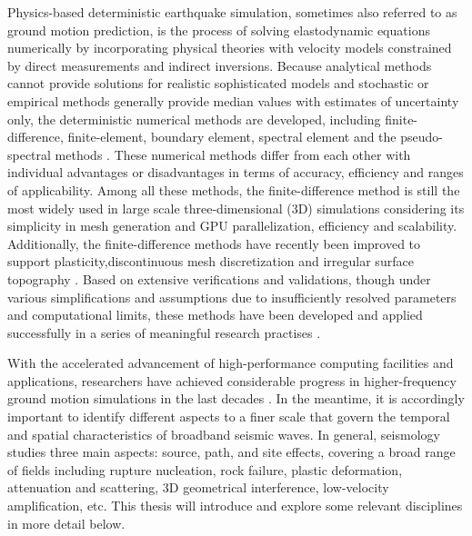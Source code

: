Physics-based deterministic earthquake simulation, sometimes also referred to as ground motion prediction, is the process of solving elastodynamic equations numerically by incorporating physical theories with velocity models constrained by direct measurements and indirect inversions. Because analytical methods cannot provide solutions for realistic sophisticated models and stochastic or empirical methods generally provide median values with estimates of uncertainty only, the deterministic numerical methods are developed, including finite-difference, finite-element, boundary element, spectral element and the pseudo-spectral methods . These numerical methods differ from each other with individual advantages or disadvantages in terms of accuracy, efficiency and ranges of applicability. Among all these methods, the finite-difference method is still the most widely used in large scale three-dimensional (3D) simulations considering its simplicity in mesh generation and GPU parallelization, efficiency and scalability. Additionally, the finite-difference methods have recently been improved to support plasticity,discontinuous mesh discretization and irregular surface topography . Based on extensive verifications and validations, though under various simplifications and assumptions due to insufficiently resolved parameters and computational limits, these methods have been developed and applied successfully in a series of meaningful research practises \citep[e.g., ShakeOut, PetaShake, M9 Cascadia; for more details readers are referred to ][]{cuiPetascaleEarthquakeSimulations2009,cuiTeraShakeComputationalPlatform2009,olsen2009shakeout,marafiImpactsSimulatedM92019}.

With the accelerated advancement of high-performance computing facilities and applications, researchers have achieved considerable progress in higher-frequency ground motion simulations in the last decades \citep{gravesBroadbandSimulationsSouthern2008,olsen2009shakeout,bielakShakeOutEarthquakeScenario2010,roten3DSimulationsEarthquakes2012, savranGroundMotionSimulation2019,withersGroundMotionIntraevent2019}. In the meantime, it is accordingly important to identify different aspects to a finer scale that govern the temporal and spatial characteristics of broadband seismic waves. In general, seismology studies three main aspects: source, path, and site effects, covering a broad range of fields including rupture nucleation, rock failure, plastic deformation, attenuation and scattering, 3D geometrical interference, low-velocity amplification, etc. This thesis will introduce and explore some relevant disciplines in more detail below.


